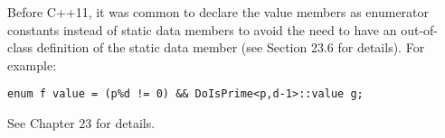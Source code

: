 \begin{tcolorbox}[colback=webgreen!5!white,colframe=webgreen!75!black]
\hspace*{0.75cm}Before C++11, it was common to declare the value members as enumerator constants instead of static data members to avoid the need to have an out-of-class definition of the static data member (see Section 23.6 for details). For example:
\begin{lstlisting}[style=styleCXX]
enum f value = (p%d != 0) && DoIsPrime<p,d-1>::value g;
\end{lstlisting}
\end{tcolorbox}

See Chapter 23 for details.


























